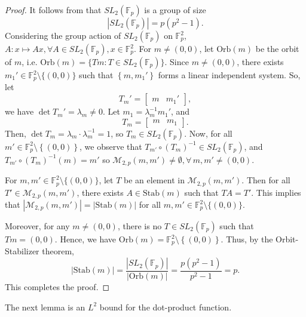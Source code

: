 \documentclass[11pt]{article}
\def\M{\mathcal{M}}
\def\Fbb{\mathbb{F}}
\def\SL{SL}
\def\l({\left(}
\def\r){\right)}
\def\lv{\left\vert}
\def\rv{\right\vert}
\def\lo{\left\{}
\def\ro{\right\}}
\begin{document}
\begin{proof}
It follows from \cite[Theorem 13.3.3]{M.P.13} that $\SL_2(\mathbb{F}_p)$ is a group of size
    \[\lv \SL_2  \l( \Fbb_p \r) \rv = p\l( p^2-1 \r) .\]
Considering the group action of $\SL_2 \l( \Fbb_p \r) $ on $\Fbb_p^2$, $A : x \mapsto Ax , \forall A \in \SL_2 \l( \Fbb_p \r) ,x\in \Fbb_p^2$. For $m \ne (0,0)$, let $\text{Orb}(m)$ be the orbit of $m$, i.e. $\text{Orb}(m)=\{Tm\colon T\in \SL_2(\Fbb_p)\}$. Since $m\ne (0,0)$, there exists $m_1' \in \Fbb_p^2 \setminus \{ (0,0) \}$ such that 
$\lo m, m_1'\ro$ forms a linear independent system. So, let  
\[ T_m' = \begin{bmatrix}
    m&  m_1'
\end{bmatrix},\]
we have $\det T_m' = \lambda_m \ne 0$. Let $m_1= \lambda_m^{-1}m_1'$,  and
\[ T_m = \begin{bmatrix}
    m&  m_1
\end{bmatrix}.\]
Then,  $\det T_m = \lambda_m \cdot \lambda_m^{-1}=1$, so $T_m \in \SL_2(\Fbb_p)$. Now, for all $m' \in \Fbb_p^2\setminus \lo (0,0) \ro$, we observe that $T_{m'} \circ (T_m)^{-1}\in \SL_2(\Fbb_p)$, and $T_{m'} \circ (T_m)^{-1}(m)=m'$ so $\M_{2,p}(m,m') \ne \emptyset , \forall \, m,m' \ne (0,0)$. 

For $m, m'\in \mathbb{F}_p^2\setminus \{(0,0)\}$, let $T$ be an element in $\M_{2,p}(m, m')$. Then for all $T'\in \M_{2,p}(m, m')$, there exists $A\in \text{Stab}(m)$ such that $TA=T'$. This implies that $|\M_{2,p}\l( m,m' \r)|=\lv \text{Stab}(m) \rv $ for all $m,m'\in \Fbb_p^2 \setminus \{(0,0)\} $.

Moreover, for any $m\ne (0,0)$, there is no $T \in \SL_2(\Fbb_p)$ such that $T m =(0,0)$. Hence, we have $\text{Orb}(m) = \Fbb_p^2 \setminus \lo (0,0)\ro$. Thus, 
by the Orbit-Stabilizer theorem, 
\[ \lv \text{Stab}(m) \rv =\frac{\lv \SL_2 \l( \Fbb_p \r) \rv}{\lv \text{Orb} (m)\rv} = \frac{p(p^2-1)}{p^2-1}=p .\]This completes the proof. 
\end{proof}


The next lemma is an $L^2$ bound for the dot-product function.
\end{document}
